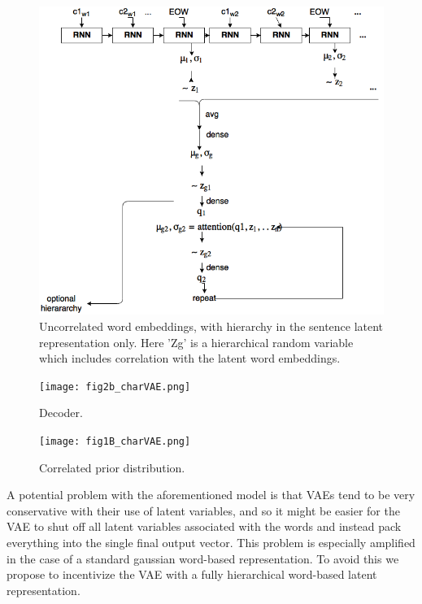 \documentclass[journal, 12pt, draftcls, onecolumn]{IEEEtran}
\begin{document}
\begin{figure}
\centering
\includegraphics[scale=0.5]{fig1_charvae.png}
\caption{Uncorrelated word embeddings, with hierarchy in the sentence latent representation only. Here 'Zg' is a hierarchical random variable which includes correlation with the latent word embeddings.}
\end{figure}

\begin{figure}
\centering
\texttt{[image: fig2b\_charVAE.png]}
\caption{Decoder.}
\end{figure}

\begin{figure}
\centering
\texttt{[image: fig1B\_charVAE.png]}
\caption{Correlated prior distribution.}
\end{figure}

A potential problem with the aforementioned model is that VAEs tend to be very conservative with their use of latent variables, and so it might be easier for the VAE to shut off all latent variables associated with the words and instead pack everything into the single final output vector. This problem is especially amplified in the case of a standard gaussian word-based representation. To avoid this we propose to incentivize the VAE with a fully hierarchical word-based latent representation.
\end{document}
